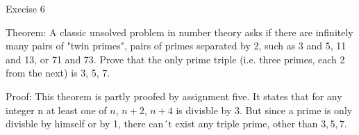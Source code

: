 \documentclass[12pt]{article}
\begin{document}
Execise 6

Theorem: A classic unsolved problem in number theory asks if there are infinitely many pairs of "twin primes", pairs of primes separated by 2, such as 3 and 5, 11 and 13, or 71 and 73. Prove that the only prime triple (i.e. three primes, each 2 from the next) is 3, 5, 7.

Proof: This theorem is partly proofed by assignment five. It states that for any integer n at least one of $n$, $n+2$, $n+4$ is divisble by 3. But since a prime is only divisble by himself or by 1, there can´t exist any triple prime, other than $3,5,7$.
\end{document}
